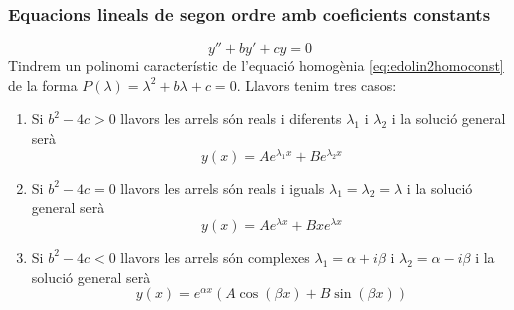 \documentclass[../main.tex]{subfiles}
\begin{document}
\subsubsection{Equacions lineals de segon ordre amb coeficients constants}
\begin{equation}
	y'' + by' + cy = 0
	\label{eq:edolin2homoconst}
\end{equation}
Tindrem un polinomi característic de l'equació homogènia \eqref{eq:edolin2homoconst} de la forma $P(\lambda) = \lambda^2 + b\lambda + c = 0$. Llavors tenim tres casos:
\begin{enumerate}
	\item Si $b^2 - 4c > 0$ llavors les arrels són reals i diferents $\lambda_1$ i $\lambda_2$ i la solució general serà
		\begin{displaymath}
			y(x) = Ae^{\lambda_1x} + Be^{\lambda_2x}
		\end{displaymath}
	\item Si $b^2 - 4c = 0$ llavors les arrels són reals i iguals $\lambda_1 = \lambda_2 = \lambda$ i la solució general serà
		\begin{displaymath}
			y(x) = Ae^{\lambda x} + Bxe^{\lambda x}
		\end{displaymath}
	\item Si $b^2 - 4c < 0$ llavors les arrels són complexes $\lambda_1 = \alpha + i\beta$ i $\lambda_2 = \alpha - i\beta$ i la solució general serà
		\begin{displaymath}
			y(x) = e^{\alpha x}(A\cos(\beta x) + B\sin(\beta x))
		\end{displaymath}
\end{enumerate}
\end{document}
